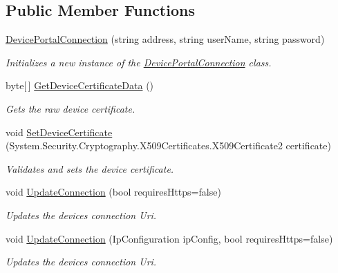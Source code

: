 \subsection*{Public Member Functions}
\begin{DoxyCompactItemize}
\item 
\hyperlink{class_test_app_io_t_1_1_device_portal_connection_af6286341087cb22e3f0e2ca32fd9173c}{Device\+Portal\+Connection} (string address, string user\+Name, string password)
\begin{DoxyCompactList}\small\item\em Initializes a new instance of the \hyperlink{class_test_app_io_t_1_1_device_portal_connection}{Device\+Portal\+Connection} class. \end{DoxyCompactList}\item 
byte\mbox{[}$\,$\mbox{]} \hyperlink{class_test_app_io_t_1_1_device_portal_connection_aedb9921b3666b1b566006609f8779dcd}{Get\+Device\+Certificate\+Data} ()
\begin{DoxyCompactList}\small\item\em Gets the raw device certificate. \end{DoxyCompactList}\item 
void \hyperlink{class_test_app_io_t_1_1_device_portal_connection_ae6d60396ebe52da0a367e2da612e3fe9}{Set\+Device\+Certificate} (System.\+Security.\+Cryptography.\+X509\+Certificates.\+X509\+Certificate2 certificate)
\begin{DoxyCompactList}\small\item\em Validates and sets the device certificate. \end{DoxyCompactList}\item 
void \hyperlink{class_test_app_io_t_1_1_device_portal_connection_abd362ff341637bbc6b9bd8901be5dd0d}{Update\+Connection} (bool requires\+Https=false)
\begin{DoxyCompactList}\small\item\em Updates the device\textquotesingle{}s connection Uri. \end{DoxyCompactList}\item 
void \hyperlink{class_test_app_io_t_1_1_device_portal_connection_a02a381f37cdbaac547f895e1da9ec87b}{Update\+Connection} (Ip\+Configuration ip\+Config, bool requires\+Https=false)
\begin{DoxyCompactList}\small\item\em Updates the device\textquotesingle{}s connection Uri. \end{DoxyCompactList}\end{DoxyCompactItemize}
